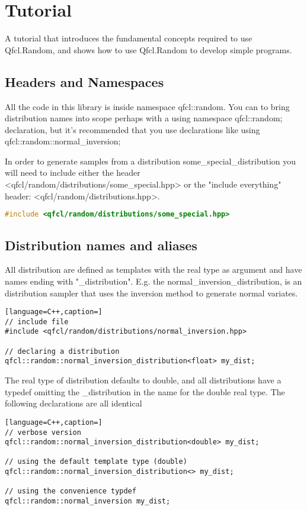 \newpage
\chapter{Tutorial}
A tutorial that introduces the fundamental concepts required to use Qfcl.Random, 
and shows how to use Qfcl.Random to develop simple programs. 


\section{Headers and Namespaces}
All the code in this library is inside namespace qfcl::random. You can to bring distribution names into scope perhaps with a using namespace qfcl::random; declaration, but it's recommended that you use declarations like using qfcl::random::normal\_inversion; 


In order to generate samples from  a distribution some\_special\_distribution you will need to include either the
header <qfcl/random/distributions/some\_special.hpp> or the "include everything" 
header: <qfcl/random/distributions.hpp>.

\begin{lstlisting}[language=C++,caption=Including a "single distribution" header]
#include <qfcl/random/distributions/some_special.hpp>
\end{lstlisting}


\section{Distribution names and aliases}
All distribution are defined as templates with the real type  as argument and have names ending with "\_distribution".
E.g. the normal\_inversion\_distribution, is an distribution sampler that uses the inversion method to generate normal variates.

\begin{lstlisting}[language=C++,caption=]
// include file
#include <qfcl/random/distributions/normal_inversion.hpp>

// declaring a distribution
qfcl::random::normal_inversion_distribution<float> my_dist;
\end{lstlisting}

The real type of distribution defaults to double, and all distributions have a typedef omitting the \_distribution in the name for the double 
real type. The following declarations are all identical

\begin{lstlisting}[language=C++,caption=]
// verbose version
qfcl::random::normal_inversion_distribution<double> my_dist;

// using the default template type (double)
qfcl::random::normal_inversion_distribution<> my_dist;

// using the convenience typdef
qfcl::random::normal_inversion my_dist;
\end{lstlisting}